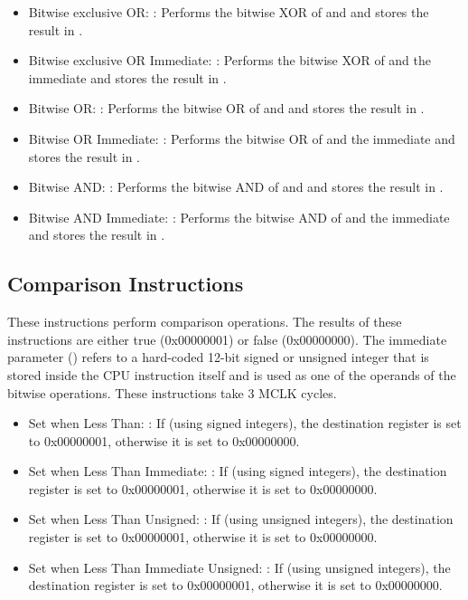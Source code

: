 \documentclass[11pt,pdftex,portrait,letterpaper]{article}
\begin{document}
\begin{itemize}
	\item Bitwise exclusive OR: : Performs the bitwise XOR of  and  and stores the result in . 
	\item Bitwise exclusive OR Immediate: : Performs the bitwise XOR of  and the immediate  and stores the result in .
	\item Bitwise OR: : Performs the bitwise OR of  and  and stores the result in . 
	\item Bitwise OR Immediate: : Performs the bitwise OR of  and the immediate  and stores the result in .
	\item Bitwise AND: : Performs the bitwise AND of  and  and stores the result in . 
	\item Bitwise AND Immediate: : Performs the bitwise AND of  and the immediate  and stores the result in .
\end{itemize}

\subsection{Comparison Instructions}

These instructions perform comparison operations. The results of these instructions are either true (0x00000001) or false (0x00000000). The immediate parameter () refers to a hard-coded 12-bit signed or unsigned integer that is stored inside the CPU instruction itself and is used as one of the operands of the bitwise operations. These instructions take 3 MCLK cycles.

\begin{itemize}
	\item Set when Less Than: : If  (using signed integers), the destination register  is set to 0x00000001, otherwise it is set to 0x00000000.
	\item Set when Less Than Immediate: : If  (using signed integers), the destination register  is set to 0x00000001, otherwise it is set to 0x00000000.
	\item Set when Less Than Unsigned: : If  (using unsigned integers), the destination register  is set to 0x00000001, otherwise it is set to 0x00000000.
	\item Set when Less Than Immediate Unsigned: : If  (using unsigned integers), the destination register  is set to 0x00000001, otherwise it is set to 0x00000000.
\end{itemize}
\end{document}
